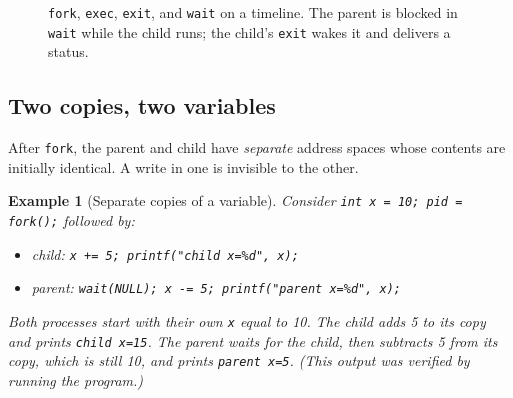 \documentclass[11pt]{article}
\newtheorem{example}{Example}
\begin{document}
\begin{figure}[h]
\centering
\caption{\texttt{fork}, \texttt{exec}, \texttt{exit}, and \texttt{wait} on a
timeline. The parent is blocked in \texttt{wait} while the child runs; the
child's \texttt{exit} wakes it and delivers a status.}
\label{fig:timeline}
\end{figure}

\subsection{Two copies, two variables}

After \texttt{fork}, the parent and child have \emph{separate} address spaces
whose contents are initially identical. A write in one is invisible to the
other.

\begin{example}[Separate copies of a variable]
\label{ex:copies}
Consider \texttt{int x = 10; pid = fork();} followed by:
\begin{itemize}
  \item child: \texttt{x += 5; printf("child x=\%d", x);}
  \item parent: \texttt{wait(NULL); x -= 5; printf("parent x=\%d", x);}
\end{itemize}
Both processes start with their own \texttt{x} equal to 10. The child adds 5
to its copy and prints \texttt{child x=15}. The parent waits for the child,
then subtracts 5 from \emph{its} copy, which is still 10, and prints
\texttt{parent x=5}. (This output was verified by running the program.)
\end{example}
\end{document}
